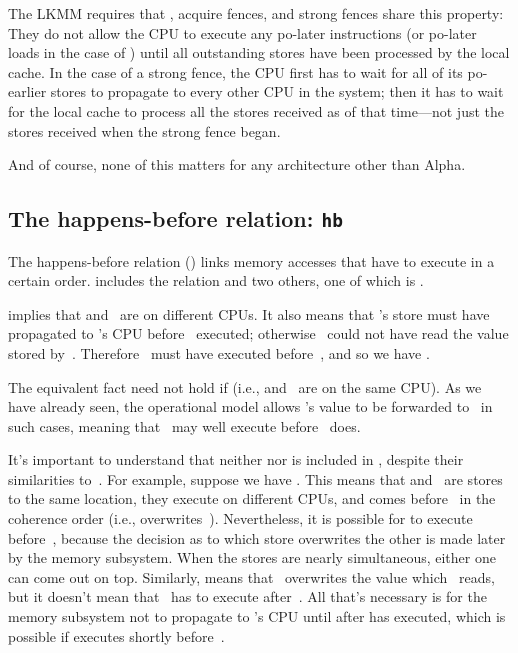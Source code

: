 The LKMM requires that , acquire fences, and strong fences
share this property:
They do not allow the CPU to execute any po-later instructions (or
po-later loads in the case of ) until all outstanding
stores have been processed by the local cache.
In the case of a strong fence, the CPU first has to wait for all of its
po-earlier stores to propagate to every other CPU in the system; then
it has to wait for the local cache to process all the stores received
as of that time---not just the stores received when the strong fence
began.

And of course, none of this matters for any architecture other than
Alpha.


\subsection{The happens-before relation: \texttt{hb}}
\label{sec:docs:explanation:The happens-before relation: hb}

The happens-before relation () links memory accesses that have to
execute in a certain order.
 includes the  relation and two others, one of which is .

 implies that  and~ are on different CPUs.
It also means that 's store must have propagated to 's
CPU before ~executed; otherwise ~could not have read the
value stored by~.
Therefore ~must have executed before~, and so we have
.

The equivalent fact need not hold if 
(i.e.,  and~ are on the same CPU\@).
As we have already seen, the operational model allows 's value
to be forwarded to~ in such cases, meaning that ~may well
execute before ~does.

It's important to understand that neither  nor  is included in
, despite their similarities to~.
For example, suppose we have .
This means that  and~ are stores to the same location,
they execute on different CPUs, and  comes before~ in the coherence
order (i.e.,  overwrites~).
Nevertheless, it is possible for  to execute before~,
because the decision as to which store overwrites the other is made
later by the memory subsystem.
When the stores are nearly simultaneous, either one can come out on top.
Similarly,  means that ~overwrites the value
which ~reads, but it doesn't mean that ~has to execute
after~.
All that's necessary is for the memory subsystem not to propagate 
to 's CPU until after  has executed, which is possible if
 executes shortly before~.

